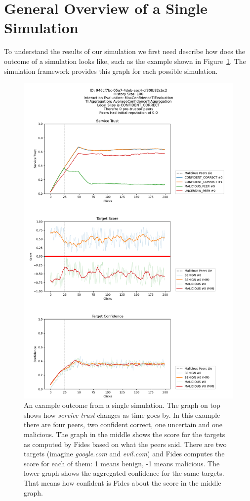 \section{General Overview of a Single Simulation}
\label{sec:general-overview-of-simulation-output}
To understand the results of our simulation we first need describe how does the outcome of a simulation looks like, such as the example shown in Figure~\ref{fig:single-simulation-example}.
The simulation framework provides this graph for each possible simulation.

\begin{figure}
    \centering
    \includegraphics[width=1.0\textwidth]{assets/example_evaluation.png}
    \caption{An example outcome from a single simulation. The graph on top shows how \textit{service trust} changes as time goes by. In this example there are four peers, two confident correct, one uncertain and one malicious. The graph in the middle shows the score for the targets as computed by Fides based on what the peers said. There are two targets (imagine \textit{google.com} and \textit{evil.com}) and Fides computes the score for each of them: 1 means benign, -1 means malicious. The lower graph shows the aggregated confidence for the same targets. That means how confident is Fides about the score in the middle graph.}
    \label{fig:single-simulation-example}
\end{figure}

